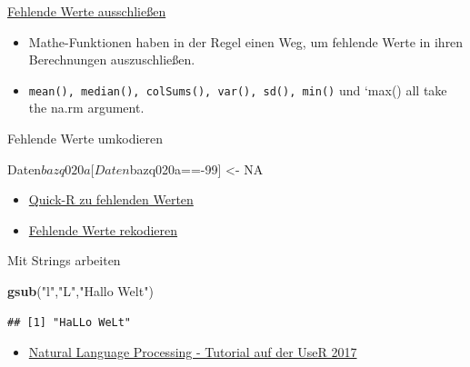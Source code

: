 \documentclass[ignorenonframetext,]{beamer}
\newenvironment{Shaded}{}{}
\newcommand{\KeywordTok}[1]{\textcolor[rgb]{0.00,0.44,0.13}{\textbf{{#1}}}}
\newcommand{\DecValTok}[1]{\textcolor[rgb]{0.25,0.63,0.44}{{#1}}}
\newcommand{\StringTok}[1]{\textcolor[rgb]{0.25,0.44,0.63}{{#1}}}
\newcommand{\OtherTok}[1]{\textcolor[rgb]{0.00,0.44,0.13}{{#1}}}
\newcommand{\NormalTok}[1]{{#1}}
\providecommand{\tightlist}{%
\setlength{\itemsep}{0pt}\setlength{\parskip}{0pt}}
\begin{document}
\begin{frame}[fragile]{\href{http://faculty.nps.edu/sebuttre/home/R/missings.html}{Fehlende
Werte ausschließen}}

\begin{itemize}
\tightlist
\item
  Mathe-Funktionen haben in der Regel einen Weg, um fehlende Werte in
  ihren Berechnungen auszuschließen.
\item
  \texttt{mean(),\ median(),\ colSums(),\ var(),\ sd(),\ min()} und
  `max() all take the na.rm argument.
\end{itemize}

\end{frame}

\begin{frame}[fragile]{Fehlende Werte umkodieren}

\begin{Shaded}
\begin{Highlighting}[]
\NormalTok{Daten$bazq020a[Daten$bazq020a==-}\DecValTok{99}\NormalTok{] <-}\StringTok{ }\OtherTok{NA}
\end{Highlighting}
\end{Shaded}

\begin{itemize}
\item
  \href{http://www.statmethods.net/input/missingdata.html}{Quick-R zu
  fehlenden Werten}
\item
  \href{http://uc-r.github.io/na_recode}{Fehlende Werte rekodieren}
\end{itemize}

\end{frame}

\begin{frame}[fragile]{Mit Strings arbeiten}

\begin{Shaded}
\begin{Highlighting}[]
\KeywordTok{gsub}\NormalTok{(}\StringTok{"l"}\NormalTok{,}\StringTok{"L"}\NormalTok{,}\StringTok{"Hallo Welt"}\NormalTok{)}
\end{Highlighting}
\end{Shaded}

\begin{verbatim}
## [1] "HaLLo WeLt"
\end{verbatim}

\begin{itemize}
\tightlist
\item
  \href{https://github.com/statsmaths/useR2017_nlp}{Natural Language
  Processing - Tutorial auf der UseR 2017}
\end{itemize}

\end{frame}
\end{document}
